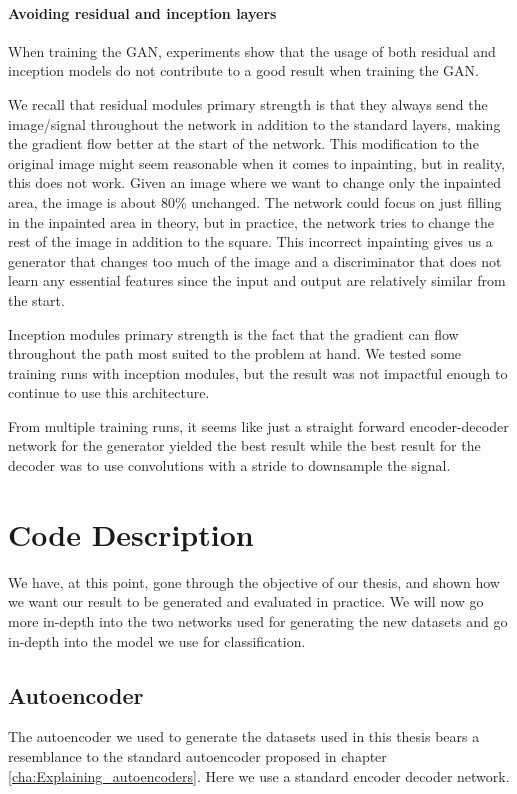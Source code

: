 \paragraph{Avoiding residual and inception layers}
When training the GAN, experiments show that the usage of both residual \cite{Rumelhart:1986:LIR:104279.104293} and inception \cite{DBLP:journals/corr/SzegedyLJSRAEVR14} models do not contribute to a good result when training the GAN.

We recall that residual modules primary strength is that they always send the image/signal throughout the network in addition to the standard layers, making the gradient flow better at the start of the network. 
This modification to the original image might seem reasonable when it comes to inpainting, but in reality, this does not work.  Given an image where we want to change only the inpainted area, the image is about 80\% unchanged. The network could focus on just filling in the inpainted area in theory, but in practice, the network tries to change the rest of the image in addition to the square. This incorrect inpainting gives us a generator that changes too much of the image and a discriminator that does not learn any essential features since the input and output are relatively similar from the start.

Inception modules primary strength is the fact that the gradient can flow throughout the path most suited to the problem at hand.
We tested some training runs with inception modules, but the result was not impactful enough to continue to use this architecture.

From multiple training runs, it seems like just a straight forward encoder-decoder network for the generator yielded the best result while the best result for the decoder was to use convolutions with a stride to downsample the signal.



\FloatBarrier
\section{Code Description}
We have, at this point, gone through the objective of our thesis, and shown how we want our result to be generated and evaluated in practice. 
We will now go more in-depth into the two networks used for generating the new datasets and go in-depth into the model we use for classification.


\subsection{Autoencoder}
The autoencoder we used to generate the datasets used in this thesis bears a resemblance to the standard autoencoder proposed in chapter \ref{cha:Explaining_autoencoders}. Here we use a standard encoder decoder network.

